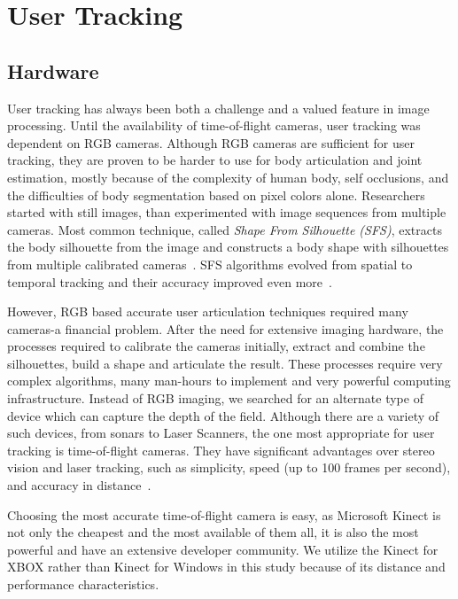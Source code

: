 \chapter{User Tracking}
\label{appendix_user_tracking}

\section{Hardware}

User tracking has always been both a challenge and a valued feature in image processing. Until the availability of time-of-flight cameras, user tracking was dependent on RGB cameras. Although RGB cameras are sufficient for user tracking, they are proven to be harder to use for body articulation and joint estimation, mostly because of the complexity of human body, self occlusions, and the difficulties of body segmentation based on pixel colors alone. Researchers started with still images, than experimented with image sequences from multiple cameras. Most common technique, called {\em Shape From Silhouette (SFS)}, extracts the body silhouette from the image and constructs a body shape with silhouettes from multiple calibrated cameras~\cite{Cheung2005}. SFS algorithms evolved from spatial to temporal tracking and their accuracy improved even more~\cite{Cheung2005}. 

However, RGB based accurate user articulation techniques required many cameras-a financial problem. After the need for extensive imaging hardware, the processes required to calibrate the cameras initially, extract and combine the silhouettes, build a shape and articulate the result. These processes require very complex algorithms, many man-hours to implement and very powerful computing infrastructure. Instead of RGB imaging, we searched for an alternate type of device which can capture the depth of the field. Although there are a variety of such devices, from sonars to Laser Scanners, the one most appropriate for user tracking is time-of-flight cameras. They have significant advantages over stereo vision and laser tracking, such as simplicity, speed (up to 100 frames per second), and accuracy in distance~\cite{Kourosh2012}.

Choosing the most accurate time-of-flight camera is easy, as Microsoft Kinect is not only the cheapest and the most available of them all, it is also the most powerful and have an extensive developer community. We utilize the Kinect for XBOX rather than Kinect for Windows in this study because of its distance and performance characteristics.

